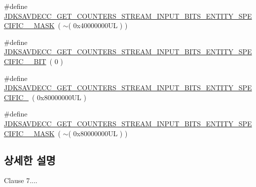 \begin{DoxyCompactItemize}
\item 
\#define \hyperlink{group__get__counters__stream__input__bits_ga822cdbbc6fe6896fd31b7e23e006014a}{J\+D\+K\+S\+A\+V\+D\+E\+C\+C\+\_\+\+G\+E\+T\+\_\+\+C\+O\+U\+N\+T\+E\+R\+S\+\_\+\+S\+T\+R\+E\+A\+M\+\_\+\+I\+N\+P\+U\+T\+\_\+\+B\+I\+T\+S\+\_\+\+E\+N\+T\+I\+T\+Y\+\_\+\+S\+P\+E\+C\+I\+F\+I\+C\+\_\+\_\+\+M\+A\+SK}~( $\sim$( 0x40000000\+U\+L ) )
\item 
\#define \hyperlink{group__get__counters__stream__input__bits_gaffef1a8cd0292843b97d1b650f02a66f}{J\+D\+K\+S\+A\+V\+D\+E\+C\+C\+\_\+\+G\+E\+T\+\_\+\+C\+O\+U\+N\+T\+E\+R\+S\+\_\+\+S\+T\+R\+E\+A\+M\+\_\+\+I\+N\+P\+U\+T\+\_\+\+B\+I\+T\+S\+\_\+\+E\+N\+T\+I\+T\+Y\+\_\+\+S\+P\+E\+C\+I\+F\+I\+C\+\_\+\_\+\+B\+IT}~( 0 )
\item 
\#define \hyperlink{group__get__counters__stream__input__bits_ga30ee4a81bb221ae290d54f72aec76c21}{J\+D\+K\+S\+A\+V\+D\+E\+C\+C\+\_\+\+G\+E\+T\+\_\+\+C\+O\+U\+N\+T\+E\+R\+S\+\_\+\+S\+T\+R\+E\+A\+M\+\_\+\+I\+N\+P\+U\+T\+\_\+\+B\+I\+T\+S\+\_\+\+E\+N\+T\+I\+T\+Y\+\_\+\+S\+P\+E\+C\+I\+F\+I\+C\+\_}~( 0x80000000\+U\+L )
\item 
\#define \hyperlink{group__get__counters__stream__input__bits_ga0aa0b6d3eabf01a726fd5d2ec983e810}{J\+D\+K\+S\+A\+V\+D\+E\+C\+C\+\_\+\+G\+E\+T\+\_\+\+C\+O\+U\+N\+T\+E\+R\+S\+\_\+\+S\+T\+R\+E\+A\+M\+\_\+\+I\+N\+P\+U\+T\+\_\+\+B\+I\+T\+S\+\_\+\+E\+N\+T\+I\+T\+Y\+\_\+\+S\+P\+E\+C\+I\+F\+I\+C\+\_\+\_\+\+M\+A\+SK}~( $\sim$( 0x80000000\+U\+L ) )
\end{DoxyCompactItemize}


\subsection{상세한 설명}

\begin{DoxyItemize}
\item Clause 7.... 
\end{DoxyItemize}

